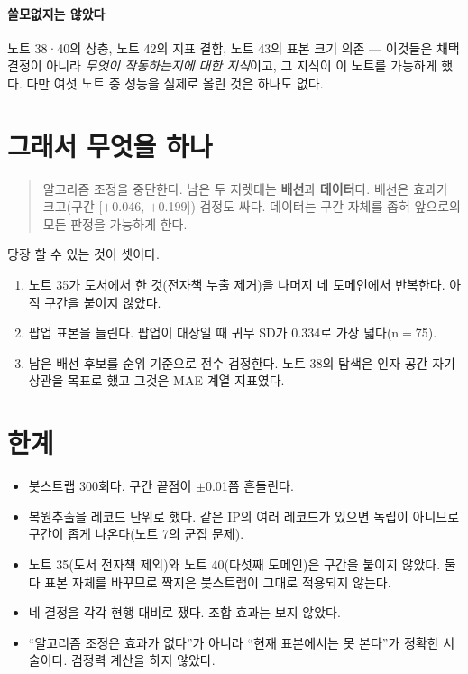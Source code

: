 \documentclass[10pt]{article}
\begin{document}
\paragraph{쓸모없지는 않았다}
노트 38·40의 상충, 노트 42의 지표 결함, 노트 43의 표본 크기 의존 --- 이것들은
채택 결정이 아니라 \emph{무엇이 작동하는지에 대한 지식}이고, 그 지식이 이 노트를
가능하게 했다. 다만 여섯 노트 중 성능을 실제로 올린 것은 하나도 없다.

\section{그래서 무엇을 하나}

\begin{quote}\fontsize{9.5}{11.5}\selectfont
알고리즘 조정을 중단한다. 남은 두 지렛대는 \textbf{배선}과 \textbf{데이터}다.
배선은 효과가 크고(구간 [$+$0.046, $+$0.199]) 검정도 싸다. 데이터는 구간
자체를 좁혀 앞으로의 모든 판정을 가능하게 한다.
\end{quote}

당장 할 수 있는 것이 셋이다.

\begin{enumerate}[leftmargin=1.3em,itemsep=0.15em]
\item 노트 35가 도서에서 한 것(전자책 누출 제거)을 나머지 네 도메인에서 반복한다.
      아직 구간을 붙이지 않았다.
\item 팝업 표본을 늘린다. 팝업이 대상일 때 귀무 SD가 0.334로 가장 넓다(n$=$75).
\item 남은 배선 후보를 순위 기준으로 전수 검정한다. 노트 38의 탐색은 인자 공간
      자기 상관을 목표로 했고 그것은 MAE 계열 지표였다.
\end{enumerate}

\section{한계}

\begin{itemize}[leftmargin=1.1em,itemsep=0.15em]
\item 붓스트랩 300회다. 구간 끝점이 $\pm$0.01쯤 흔들린다.
\item 복원추출을 레코드 단위로 했다. 같은 IP의 여러 레코드가 있으면 독립이
      아니므로 구간이 좁게 나온다(노트 7의 군집 문제).
\item 노트 35(도서 전자책 제외)와 노트 40(다섯째 도메인)은 구간을 붙이지 않았다.
      둘 다 표본 자체를 바꾸므로 짝지은 붓스트랩이 그대로 적용되지 않는다.
\item 네 결정을 각각 현행 대비로 쟀다. 조합 효과는 보지 않았다.
\item ``알고리즘 조정은 효과가 없다''가 아니라 ``현재 표본에서는 못 본다''가
      정확한 서술이다. 검정력 계산을 하지 않았다.
\end{itemize}
\end{document}
